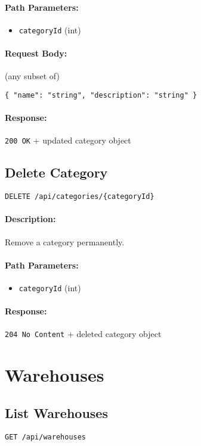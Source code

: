 \documentclass[a4paper,11pt]{article}
\begin{document}
\paragraph{Path Parameters:}
\begin{itemize}
  \item \texttt{categoryId} (int)
\end{itemize}
\paragraph{Request Body:} (any subset of)
\begin{verbatim}
{ "name": "string", "description": "string" }
\end{verbatim}
\paragraph{Response:} \texttt{200 OK} + updated category object

\subsection{Delete Category}
\label{sec:categories-delete}
\begin{verbatim}
DELETE /api/categories/{categoryId}
\end{verbatim}
\paragraph{Description:} Remove a category permanently.
\paragraph{Path Parameters:}
\begin{itemize}
  \item \texttt{categoryId} (int)
\end{itemize}
\paragraph{Response:} \texttt{204 No Content} + deleted category object

\section{Warehouses}
\label{sec:warehouses}

\subsection{List Warehouses}
\label{sec:warehouses-all}
\begin{verbatim}
GET /api/warehouses
\end{verbatim}
\end{document}
